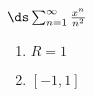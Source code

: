 {$\ds\sum_{n=1}^\infty \frac{x^n}{n^2}$
}
{\begin{enumerate}
	\item $R=1$
	\item	$[-1,1]$
\end{enumerate}
}